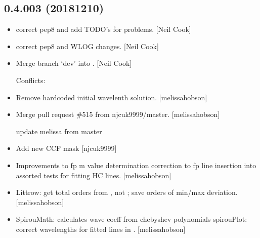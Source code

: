\documentclass[a4paper,10pt,english]{report}
\begin{document}
\subsection{0.4.003 (2018\sphinxhyphen{}12\sphinxhyphen{}10)}
\label{\detokenize{misc/changelog:id261}}\begin{itemize}
\item {} 
 \sphinxhyphen{} correct pep8 and add TODO’s for problems.
{[}Neil Cook{]}

\item {} 
 \sphinxhyphen{} correct pep8 and WLOG changes. {[}Neil
Cook{]}

\item {} 
Merge branch ‘dev’ into . {[}Neil Cook{]}
\begin{description}
\item[{Conflicts:}] \leavevmode
{}

\end{description}

\item {} 
Remove hard\sphinxhyphen{}coded initial wavelenth solution. {[}melissa\sphinxhyphen{}hobson{]}

\item {} 
Merge pull request \#515 from njcuk9999/master. {[}melissa\sphinxhyphen{}hobson{]}

update melissa from master

\item {} 
Add new CCF mask  {[}njcuk9999{]}

\item {} 
Improvements to  fp m value determination
correction to fp line insertion into  assorted tests for
fitting HC lines. {[}melissa\sphinxhyphen{}hobson{]}

\item {} 
Littrow: get total orders from , not ; save
orders of min/max deviation. {[}melissa\sphinxhyphen{}hobson{]}

\item {} 
SpirouMath: calculates wave coeff from chebyshev polynomials
spirouPlot: correct wavelengths for fitted lines in
. {[}melissa\sphinxhyphen{}hobson{]}


\end{itemize}
\end{document}
